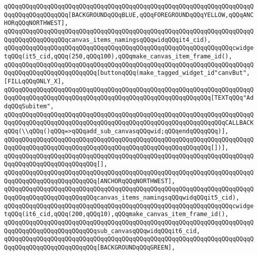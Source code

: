 \verb|qQQqqQQqqQQqqQQqqQQqqQQqqQQqqQQqqQQqqQQqqQQqqQQqqQQqqQQqqQQqqQQqqQQqqQQqqQQqqQQqqQQqqQQq[BACKGROUNDqQQqBLUE,qQQqFOREGROUNDqQQqYELLOW,qQQqANCHORqQQqNORTHWEST],|\newline
\verb|qQQqqQQqqQQqqQQqqQQqqQQqqQQqqQQqqQQqqQQqqQQqqQQqqQQqqQQqqQQqqQQqqQQqqQQqqQQqqQQqqQQqqQQqcanvas_items_namingsqQQqwidqQQqit4_cid),|\newline
\newline
\verb|qQQqqQQqqQQqqQQqqQQqqQQqqQQqqQQqqQQqqQQqqQQqqQQqqQQqqQQqqQQqqQQqcwidgetqQQq(it5_cid,qQQq(250,qQQq100),qQQqmake_canvas_item_frame_id(),|\newline
\verb|qQQqqQQqqQQqqQQqqQQqqQQqqQQqqQQqqQQqqQQqqQQqqQQqqQQqqQQqqQQqqQQqqQQqqQQqqQQqqQQqqQQqqQQqqQQqqQQq[buttonqQQq(make_tagged_widget_id"canvBut",[FILLqQQqONLY_X],|\newline
\verb|qQQqqQQqqQQqqQQqqQQqqQQqqQQqqQQqqQQqqQQqqQQqqQQqqQQqqQQqqQQqqQQqqQQqqQQqqQQqqQQqqQQqqQQqqQQqqQQqqQQqqQQqqQQqqQQqqQQqqQQqqQQqqQQq[TEXTqQQq"AddqQQqSubitem",|\newline
\verb|qQQqqQQqqQQqqQQqqQQqqQQqqQQqqQQqqQQqqQQqqQQqqQQqqQQqqQQqqQQqqQQqqQQqqQQqqQQqqQQqqQQqqQQqqQQqqQQqqQQqqQQqqQQqqQQqqQQqqQQqqQQqqQQqqQQqCALLBACKqQQq(\\qQQq()qQQq=>qQQqadd_sub_canvasqQQqwid;qQQqendqQQqqQQq)],|\newline
\verb|qQQqqQQqqQQqqQQqqQQqqQQqqQQqqQQqqQQqqQQqqQQqqQQqqQQqqQQqqQQqqQQqqQQqqQQqqQQqqQQqqQQqqQQqqQQqqQQqqQQqqQQqqQQqqQQqqQQqqQQqqQQqqQQq[])],|\newline
\verb|qQQqqQQqqQQqqQQqqQQqqQQqqQQqqQQqqQQqqQQqqQQqqQQqqQQqqQQqqQQqqQQqqQQqqQQqqQQqqQQqqQQqqQQqqQQqqQQq[],|\newline
\verb|qQQqqQQqqQQqqQQqqQQqqQQqqQQqqQQqqQQqqQQqqQQqqQQqqQQqqQQqqQQqqQQqqQQqqQQqqQQqqQQqqQQqqQQqqQQqqQQq[ANCHORqQQqNORTHWEST],|\newline
\verb|qQQqqQQqqQQqqQQqqQQqqQQqqQQqqQQqqQQqqQQqqQQqqQQqqQQqqQQqqQQqqQQqqQQqqQQqqQQqqQQqqQQqqQQqqQQqqQQqcanvas_items_namingsqQQqwidqQQqit5_cid),|\newline
\newline
\verb|qQQqqQQqqQQqqQQqqQQqqQQqqQQqqQQqqQQqqQQqqQQqqQQqqQQqqQQqqQQqqQQqcwidgetqQQq(it6_cid,qQQq(200,qQQq10),qQQqmake_canvas_item_frame_id(),|\newline
\verb|qQQqqQQqqQQqqQQqqQQqqQQqqQQqqQQqqQQqqQQqqQQqqQQqqQQqqQQqqQQqqQQqqQQqqQQqqQQqqQQqqQQqqQQqqQQqqQQqsub_canvasqQQqwidqQQqit6_cid,|\newline
\verb|qQQqqQQqqQQqqQQqqQQqqQQqqQQqqQQqqQQqqQQqqQQqqQQqqQQqqQQqqQQqqQQqqQQqqQQqqQQqqQQqqQQqqQQqqQQqqQQq[BACKGROUNDqQQqGREEN],|\newline
